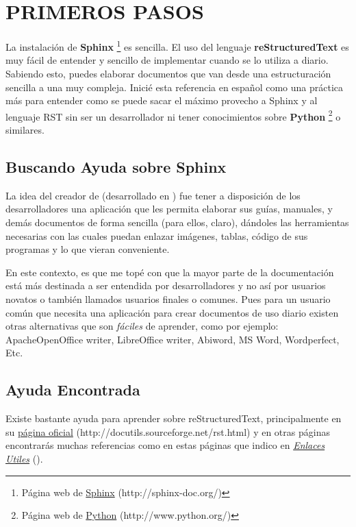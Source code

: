 \documentclass[letterpaper,10pt,spanish]{sphinxmanual}
\begin{document}
\chapter{PRIMEROS PASOS}
\label{parte01:primeros-pasos}\label{parte01:id3}
La instalación de \textbf{Sphinx} \footnote[1]{
Página web de \href{http://sphinx-doc.org/}{Sphinx} (http://sphinx-doc.org/)
} es sencilla. El uso del lenguaje \textbf{reStructuredText} es muy fácil de entender y sencillo de implementar cuando se lo utiliza a diario.
Sabiendo esto, puedes elaborar documentos que van desde una estructuración sencilla a una muy compleja.
Inicié esta referencia en español como una práctica más para entender como se puede sacar el máximo provecho a Sphinx y al lenguaje RST sin ser un desarrollador
ni tener conocimientos sobre \textbf{Python} \footnote[2]{
Página web de \href{http://www.python.org/}{Python} (http://www.python.org/)
} o similares.


\section{Buscando Ayuda sobre Sphinx}
\label{parte01:buscando-ayuda}\label{parte01:buscando-ayuda-sobre-sphinx}
La idea del creador de  (desarrollado en ) fue tener a disposición de los desarrolladores una aplicación que les permita elaborar sus guías, manuales, y demás documentos de forma sencilla (para ellos, claro), dándoles las herramientas necesarias con las cuales puedan enlazar imágenes, tablas, código de sus programas y lo que vieran conveniente.

En este contexto, es que me topé con que la mayor parte de la documentación está más destinada a ser entendida por desarrolladores y no así por usuarios novatos o también llamados usuarios finales o comunes. Pues para un usuario común que necesita una aplicación para crear documentos de uso diario existen otras alternativas que son \emph{fáciles} de aprender, como por ejemplo: ApacheOpenOffice writer, LibreOffice writer, Abiword, MS Word, Wordperfect, Etc.


\section{Ayuda  Encontrada}
\label{parte01:ayuda-encontrada}\label{parte01:id6}
Existe bastante ayuda para aprender sobre reStructuredText, principalmente en su \href{http://docutils.sourceforge.net/rst.html}{página oficial} (http://docutils.sourceforge.net/rst.html) y en otras páginas encontrarás muchas referencias como en estas páginas que indico en {\hyperref[anexo:enlaces\string-utiles]{\emph{Enlaces Utiles}}} ().
\end{document}
